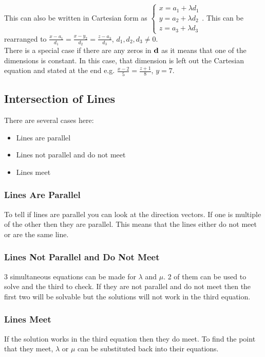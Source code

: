 \documentclass[class=article, crop=false]{standalone}
\begin{document}
This can also be written in Cartesian form as $\begin{cases} x = a_1 + \lambda d_1 \\ y = a_2 + \lambda d_2 \\ z = a_3 + \lambda d_3 \end{cases}$. This can be rearranged to $\frac{x-a_1}{d_1}=\frac{x-y_2}{d_2}=\frac{z-a_3}{d_3}$, $d_1, d_2, d_3 \neq 0$. \\

There is a special case if there are any zeros in $\bold{d}$ as it means that one of the dimensions is constant. In this case, that dimension is left out the Cartesian equation and stated at the end e.g. $\frac{x-2}{5}=\frac{z+1}{8}$, $y=7$.

\subsection*{Intersection of Lines}
There are several cases here:
\begin{itemize}
	\item Lines are parallel
	\item Lines not parallel and do not meet
	\item Lines meet
\end{itemize}
\subsubsection*{Lines Are Parallel}
To tell if lines are parallel you can look at the direction vectors. If one is multiple of the other then they are parallel. This means that the lines either do not meet or are the same line. 

\subsubsection*{Lines Not Parallel and Do Not Meet}
3 simultaneous equations can be made for $\lambda$ and $\mu$. 2 of them can be used to solve and the third to check. If they are not parallel and do not meet then the first two will be solvable but the solutions will not work in the third equation. 

\subsubsection*{Lines Meet}
If the solution works in the third equation then they do meet. To find the point that they meet, $\lambda$ or $\mu$ can be substituted back into their equations. 
\end{document}
